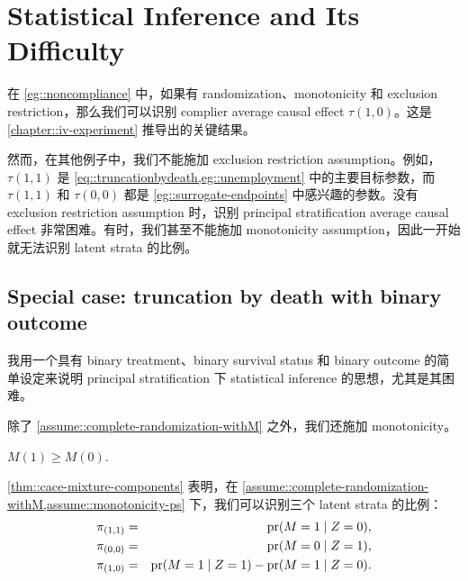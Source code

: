 \section{Statistical Inference and Its Difficulty}
\label{sec::difficulty-of-PS}

在 \cref{eg::noncompliance} 中，如果有 randomization、monotonicity 和 exclusion restriction，那么我们可以识别 complier average causal effect $\tau(1,0)$。这是 \cref{chapter::iv-experiment} 推导出的关键结果。


然而，在其他例子中，我们不能施加 exclusion restriction assumption。例如，$\tau(1,1)$ 是 \cref{eq::truncationbydeath,eg::unemployment} 中的主要目标参数，而 $\tau(1,1)$ 和 $\tau(0,0)$ 都是 \cref{eg::surrogate-endpoints} 中感兴趣的参数。没有 exclusion restriction assumption 时，识别 principal stratification average causal effect 非常困难。有时，我们甚至不能施加 monotonicity assumption，因此一开始就无法识别 latent strata 的比例。




\subsection{Special case: truncation by death with binary outcome}
我用一个具有 binary treatment、binary survival status 和 binary outcome 的简单设定来说明 principal stratification 下 statistical inference 的思想，尤其是其困难。


除了 \cref{assume::complete-randomization-withM} 之外，我们还施加 monotonicity。

\begin{assumption}
[monotonicity]\label{assume::monotonicity-ps}
$M(1) \geq M(0)$.
\end{assumption}


\cref{thm::cace-mixture-components} 表明，在 \cref{assume::complete-randomization-withM,assume::monotonicity-ps} 下，我们可以识别三个 latent strata 的比例：
\begin{eqnarray*} 
 \pi_{(1,1)} &=& \textup{pr}(M=1\mid Z=0), \\
 \pi_{(0,0)} &=& \textup{pr}(M=0\mid Z=1), \\
 \pi_{(1,0)} &=& \textup{pr}(M=1\mid Z=1) - \textup{pr}(M=1\mid Z=0). 
\end{eqnarray*} 


